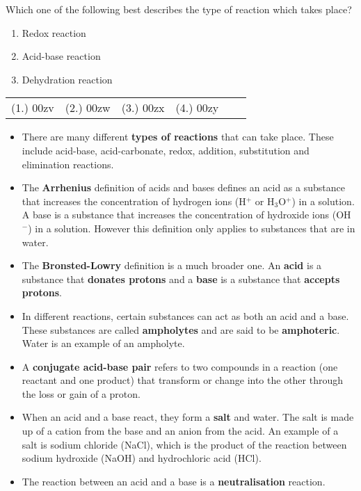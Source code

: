{\begin{enumerate}
{Which one of the following best describes the type of reaction which takes place?
\begin{enumerate}
\item{Redox reaction}
\item{Acid-base reaction}
\item{Dehydration reaction}
\end{enumerate}
}
\end{enumerate}
\practiceinfo

\begin{tabular}[h]{cccccc}
(1.) 00zv & (2.) 00zw & (3.) 00zx & (4.) 00zy & 
 \end{tabular}
}

\begin{itemize}
\item{There are many different \textbf{types of reactions} that can take place. These include acid-base, acid-carbonate, redox, addition, substitution and elimination reactions.}
\item{The \textbf{Arrhenius} definition of acids and bases defines an acid as a substance that increases the concentration of hydrogen ions (H$^{+}$ or H$_{3}$O$^{+}$) in a solution. A base is a substance that increases the concentration of hydroxide ions (OH$^{-}$) in a solution. However this definition only applies to substances that are in water.}
\item{The \textbf{Bronsted-Lowry} definition is a much broader one. An \textbf{acid} is a substance that \textbf{donates protons} and a \textbf{base} is a substance that \textbf{accepts protons}. }
\item{In different reactions, certain substances can act as both an acid and a base. These substances are called \textbf{ampholytes} and are said to be \textbf{amphoteric}. Water is an example of an ampholyte.}
\item{A \textbf{conjugate acid-base pair} refers to two compounds in a reaction (one reactant and one product) that transform or change into the other through the loss or gain of a proton.}
\item{When an acid and a base react, they form a \textbf{salt} and water. The salt is made up of a cation from the base and an anion from the acid. An example of a salt is sodium chloride (NaCl), which is the product of the reaction between sodium hydroxide (NaOH) and hydrochloric acid (HCl).}
\item{The reaction between an acid and a base is a \textbf{neutralisation} reaction.}

\end{itemize}
